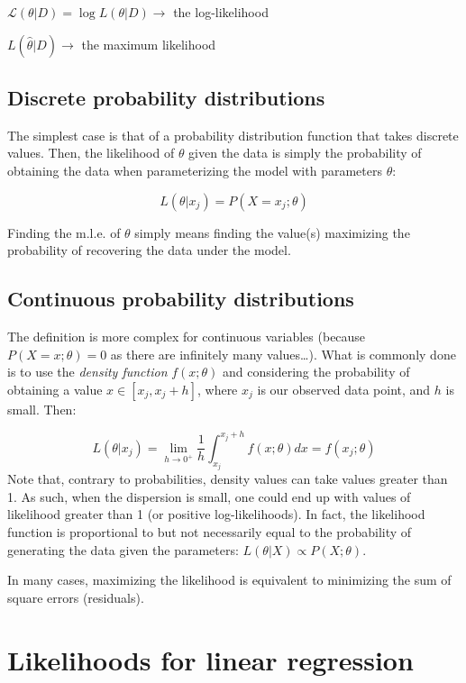 \documentclass[
  letterpaper,
  DIV=11,
  numbers=noendperiod]{scrreprt}
\begin{document}
\(\mathcal L(\theta \vert D) = \log L(\theta \vert D) \to\) the
log-likelihood

\(L(\hat{\theta} \vert D) \to\) the maximum likelihood

\subsection{Discrete probability
distributions}\label{discrete-probability-distributions-1}

The simplest case is that of a probability distribution function that
takes discrete values. Then, the likelihood of \(\theta\) given the data
is simply the probability of obtaining the data when parameterizing the
model with parameters \(\theta\):

\[L(\theta \vert x_j) = P(X = x_j; \theta)\]

Finding the m.l.e. of \(\theta\) simply means finding the value(s)
maximizing the probability of recovering the data under the model.

\subsection{Continuous probability
distributions}\label{continuous-probability-distributions-1}

The definition is more complex for continuous variables (because
\(P(X = x; \theta) = 0\) as there are infinitely many values\ldots).
What is commonly done is to use the \emph{density function}
\(f(x; \theta)\) and considering the probability of obtaining a value
\(x \in [x_j, x_j + h]\), where \(x_j\) is our observed data point, and
\(h\) is small. Then:

\[
L(\theta \vert x_j) = \lim_{h \to 0^+} \frac{1}{h} \int_{x_j}^{x_j + h} f(x ; \theta) dx = f(x_j ; \theta)
\] Note that, contrary to probabilities, density values can take values
greater than 1. As such, when the dispersion is small, one could end up
with values of likelihood greater than 1 (or positive log-likelihoods).
In fact, the likelihood function is proportional to but not necessarily
equal to the probability of generating the data given the parameters:
\(L(\theta\vert X) \propto P(X; \theta)\).

In many cases, maximizing the likelihood is equivalent to minimizing the
sum of square errors (residuals).

\section{Likelihoods for linear
regression}\label{likelihoods-for-linear-regression}
\end{document}
